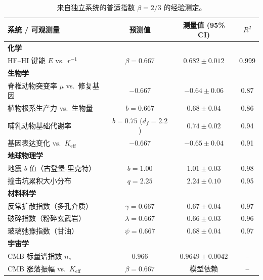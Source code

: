\documentclass[11pt,a4paper]{article}
\begin{document}
	\begin{table}[H]
		\centering
		\caption{来自独立系统的普适指数 \(\beta = 2/3\) 的经验测定。}
		\label{tab:empirical-beta}
		\small
		\begin{tabular}{lccc}
			\toprule
			\textbf{系统 / 可观测量} & \textbf{预测值} & \textbf{测量值 (95\% CI)} & \(R^2\) \\
			\midrule
			\textbf{化学} & & & \\
			\quad HF–HI 键能 \(E\) vs.\ \(r^{-1}\) & \(\beta = 0.667\) & \(0.682 \pm 0.012\) & 0.999 \\
			\textbf{生物学} & & & \\
			\quad 脊椎动物突变率 \(\mu\) vs.\ 修复基因 & \(-0.667\) & \(-0.64 \pm 0.06\) & 0.87 \\
			\quad 植物根系生产力 vs.\ 生物量 & \(b = 0.667\) & \(0.68 \pm 0.04\) & 0.86 \\
			\quad 哺乳动物基础代谢率 & \(b = 0.75\) (\(d_f=2.2\)) & \(0.74 \pm 0.02\) & 0.94 \\
			\quad 基因表达变化 vs.\ \(K_{\mathrm{eff}}\) & \(-0.667\) & \(-0.65 \pm 0.04\) & 0.91 \\
			\textbf{地球物理学} & & & \\
			\quad 地震 \(b\) 值（古登堡-里克特） & \(b = 1.00\) & \(1.01 \pm 0.03\) & 0.98 \\
			\quad 撞击坑累积大小分布 & \(q = 2.25\) & \(2.24 \pm 0.10\) & 0.95 \\
			\textbf{材料科学} & & & \\
			\quad 反常扩散指数（多孔介质） & \(\gamma = 0.667\) & \(0.67 \pm 0.04\) & 0.97 \\
			\quad 破碎指数（粉碎玄武岩） & \(\lambda = 0.667\) & \(0.66 \pm 0.03\) & 0.96 \\
			\quad 玻璃弛豫指数（甘油） & \(\psi = 0.667\) & \(0.68 \pm 0.04\) & 0.97 \\
			\textbf{宇宙学} & & & \\
			\quad CMB 标量谱指数 \(n_s\) & \(0.966\) & \(0.9649 \pm 0.0042\) & -- \\
			\quad CMB 涨落振幅 vs.\ \(K_{\mathrm{eff}}\) & \(\beta = 0.667\) & 模型依赖 & -- \\
			\bottomrule
		\end{tabular}
	\end{table}
	
\end{document}

